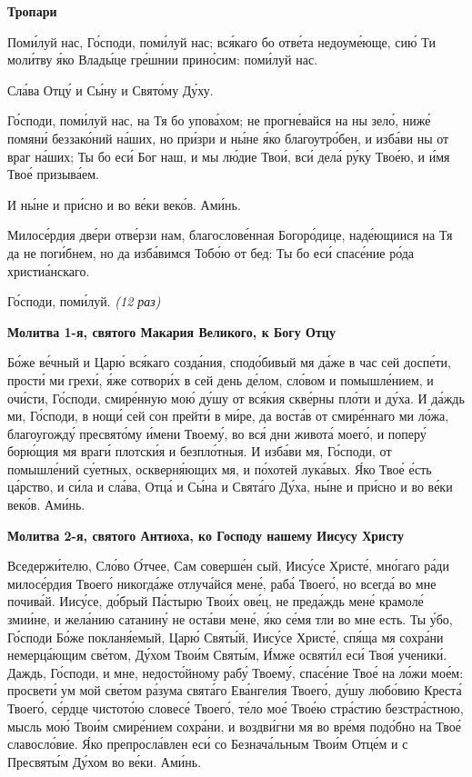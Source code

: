  

\bfseries Тропари\normalfont{}


   Поми́луй нас, Го́споди, поми́луй нас; вся́каго бо отве́та недоуме́юще, сию́
Ти моли́тву я́ко Влады́це гре́шнии прино́сим: поми́луй нас.


   Сла́ва Отцу́ и Сы́ну и Свято́му Ду́ху.


   Го́споди, поми́луй нас, на Тя бо упова́хом; не прогне́вайся на ны зело́,
ниже́ помяни́ беззако́ний на́ших, но при́зри и ны́не я́ко благоутро́бен, и
изба́ви ны от враг на́ших; Ты бо еси́ Бог наш, и мы лю́дие Твои́, вси́ дела́
ру́ку Твое́ю, и и́мя Твое́ призыва́ем.


   И ны́не и при́сно и во ве́ки веко́в. Ами́нь.


   Милосе́рдия две́ри отве́рзи нам, благослове́нная Богоро́дице, наде́ющиися
на Тя да не поги́бнем, но да изба́вимся Тобо́ю от бед: Ты бо еси́ спасе́ние
ро́да христиа́нскаго.



   Го́споди, поми́луй. \itshape (12 раз)\normalfont{}



 

\bfseries Молитва 1-я, святого Макария Великого, к Богу Отцу\normalfont{}


   Бо́же ве́чный и Царю́ вся́каго созда́ния, сподо́бивый мя да́же в час сей
доспе́ти, прости́ ми грехи́, я́же сотвори́х в сей день де́лом, сло́вом и
помышле́нием, и очи́сти, Го́споди, смире́нную мою́ ду́шу от вся́кия
скве́рны пло́ти и ду́ха. И да́ждь ми, Го́споди, в нощи́ сей сон прейти́ в
ми́ре, да воста́в от смире́ннаго ми ло́жа, благоугожду́ пресвято́му
и́мени Твоему́, во вся́ дни живота́ моего́, и поперу́ борю́щия мя враги́
плотски́я и безпло́тныя. И изба́ви мя, Го́споди, от помышле́ний су́етных,
оскверня́ющих мя, и по́хотей лука́вых. Я́ко Твое́ е́сть ца́рство, и си́ла и
сла́ва, Отца́ и Сы́на и Свята́го Ду́ха, ны́не и при́сно и во ве́ки веко́в.
Ами́нь.



 

\bfseries Молитва 2-я, святого Антиоха, ко Господу нашему Иисусу Христу\normalfont{}


   Вседержи́телю, Сло́во О́тчее, Сам соверше́н сый, Иису́се Христе́, мно́гаго
ра́ди милосе́рдия Твоего́ никогда́же отлуча́йся мене́, раба́ Твоего́,
но всегда́ во мне почива́й. Иису́се, до́брый Па́стырю Твои́х ове́ц, не
преда́ждь мене́ крамоле́ змии́не, и жела́нию сатанину́ не оста́ви мене́, я́ко
се́мя тли во мне есть. Ты у́бо, Го́споди Бо́же покланя́емый, Царю́
Святы́й, Иису́се Христе́, спя́ща мя сохра́ни немерца́ющим све́том,
Ду́хом Твои́м Святы́м, И́мже освяти́л еси́ Твоя́ ученики́. Даждь,
Го́споди, и мне, недосто́йному рабу́ Твоему́, спасе́ние Твое́ на ло́жи
мое́м: просвети́ ум мой све́том ра́зума свята́го Ева́нгелия Твоего́, ду́шу
любо́вию Креста́ Твоего́, се́рдце чистото́ю словесе́ Твоего́, те́ло мое́ Твое́ю
стра́стию безстра́стною, мысль мою́ Твои́м смире́нием сохра́ни, и
воздви́гни мя во вре́мя подо́бно на Твое́ славосло́вие. Я́ко препросла́влен
еси́ со Безнача́льным Твои́м Отце́м и с Пресвяты́м Ду́хом во ве́ки.
Ами́нь.



